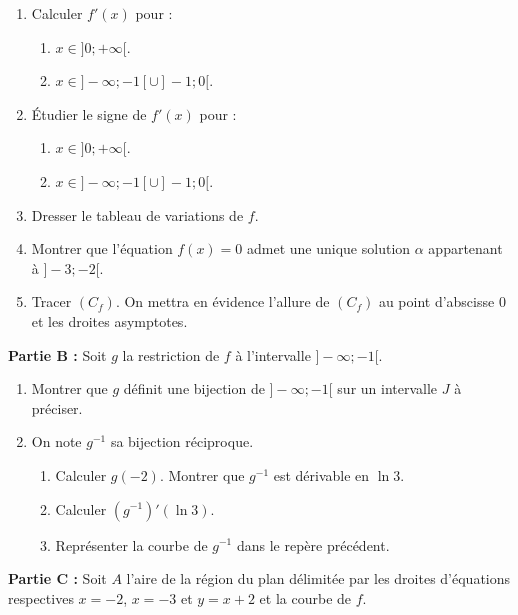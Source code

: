 \documentclass[12pt,a4paper]{article}
\begin{document}
\begin{multicols}{2}
\begin{enumerate}
    \item Calculer \( f'(x) \) pour :
    \begin{enumerate}
        \item \( x \in ]0 ; +\infty[ \).
        \item \( x \in ]-\infty ; -1[ \cup ]-1 ; 0[ \).
    \end{enumerate}

    \item Étudier le signe de \( f'(x) \) pour :
    \begin{enumerate}
        \item \( x \in ]0 ; +\infty[ \).
        \item \( x \in ]-\infty ; -1[ \cup ]-1 ; 0[ \).
    \end{enumerate}

    \item Dresser le tableau de variations de \( f \).
    \item Montrer que l’équation \( f(x) = 0 \) admet une unique solution \( \alpha \) appartenant à \( ]-3 ; -2[ \).
    
    \item Tracer \( (C_f) \). On mettra en évidence l’allure de \( (C_f) \) au point d’abscisse 0 et les droites asymptotes.
\end{enumerate}

\textbf{Partie B :} Soit \( g \) la restriction de \( f \) à l’intervalle \( ]-\infty ; -1[ \).

\begin{enumerate}
    \item Montrer que \( g \) définit une bijection de \( ]-\infty ; -1[ \) sur un intervalle \( J \) à préciser.
    
    \item On note \( g^{-1} \) sa bijection réciproque.
    \begin{enumerate}
        \item Calculer \( g(-2) \). Montrer que \( g^{-1} \) est dérivable en \( \ln 3 \).
        \item Calculer \( (g^{-1})'(\ln 3) \).
        \item Représenter la courbe de \( g^{-1} \) dans le repère précédent.
    \end{enumerate}
\end{enumerate}

\textbf{Partie C :} Soit \( A \) l’aire de la région du plan délimitée par les droites d’équations respectives \( x = -2 \), \( x = -3 \) et \( y = x + 2 \) et la courbe de \( f \).


\end{multicols}
\end{document}

